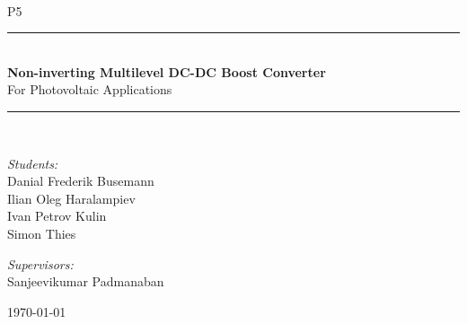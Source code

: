 \newcommand{\HRule}{\rule{\linewidth}{0.5 mm}}
\begin{titlepage}

\begin{center}
\\[0.5cm]

\textsc{\Large P5}\\[0.6cm]

\HRule \\[0.8cm]
{ \Huge \bfseries  Non-inverting Multilevel DC-DC Boost Converter}\\[0.4cm]

  \Large{For Photovoltaic Applications
  }
\HRule \\[1.2cm]

\begin{minipage}{0.49\textwidth}
\begin{flushleft} \large
\emph{Students:}\\
Danial Frederik Busemann\\
Ilian Oleg Haralampiev\\
Ivan Petrov Kulin\\
Simon Thies\\
\end{flushleft}
\end{minipage}
\begin{minipage}{0.49\textwidth}
\begin{flushright} \large
\emph{Supervisors:} \\
Sanjeevikumar Padmanaban
\end{flushright}
\end{minipage}

\vfill

{\large \today}



\end{center}

\end{titlepage}
